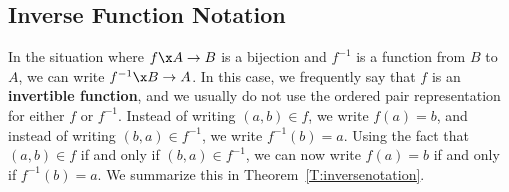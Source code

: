 \subsection*{Inverse Function Notation}
In the situation where  $f\x A \to B$  is a bijection and  $f^{ - 1} $ is a function from  $B$  to  $A$, we can write  $f^{ - 1} \x B \to A$.  In this case, we frequently say that  $f$  is an \textbf{invertible function},
%
%
  and we usually do not use the ordered pair representation for either  $f$  or  $f^{ - 1} $.  Instead of writing  
$( {a, b} ) \in f$, we write  $f( a ) = b$, and instead of writing  $( {b, a} ) \in f^{ - 1} $, we write  $f^{ - 1} ( b ) = a$.  Using the fact that  $( {a, b} ) \in f$  if and only if  $( {b, a} ) \in f^{ - 1} $, we can now write  $f( a ) = b$  if and only if  $f^{ - 1} ( b ) = a$.  We summarize this in Theorem~\ref{T:inversenotation}.

